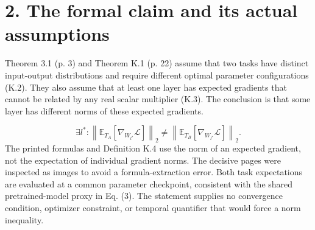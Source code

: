 \documentclass[10pt]{article}
\begin{document}
\section*{2. The formal claim and its actual assumptions}
Theorem 3.1 (p. 3) and Theorem K.1 (p. 22) assume that two tasks have distinct input-output distributions and require different optimal parameter configurations (K.2). They also assume that at least one layer has expected gradients that cannot be related by any real scalar multiplier (K.3). The conclusion is that some layer has different norms of these expected gradients.\par
\[\exists l^*: \left\|\mathbb E_{T_A}[\nabla_{W_{l^*}}\mathcal L]\right\|_2\ne\left\|\mathbb E_{T_B}[\nabla_{W_{l^*}}\mathcal L]\right\|_2.\] The printed formulas and Definition K.4 use the norm of an expected gradient, not the expectation of individual gradient norms. The decisive pages were inspected as images to avoid a formula-extraction error. Both task expectations are evaluated at a common parameter checkpoint, consistent with the shared pretrained-model proxy in Eq. (3). The statement supplies no convergence condition, optimizer constraint, or temporal quantifier that would force a norm inequality.\par
\end{document}
